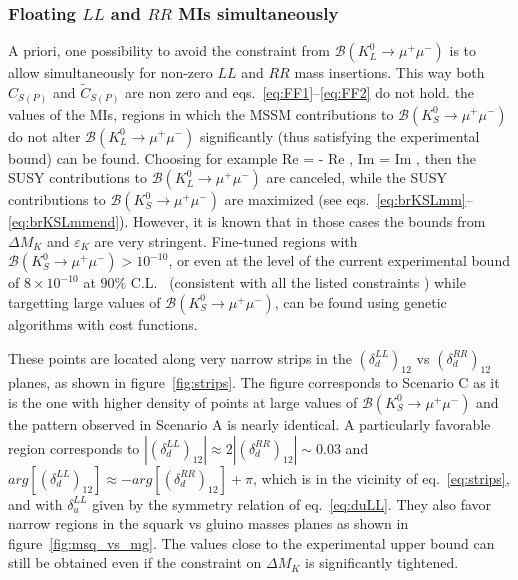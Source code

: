 \subsubsection{Floating $LL$ and $RR$ MIs simultaneously}
A priori, one possibility to avoid the constraint from $\mathcal{B}(K_L^0\rightarrow\mu^+\mu^-)$ is 
to allow simultaneously for non-zero $LL$ and $RR$ mass insertions. This way both $C_{S(P)}$ and $\tilde{C}_{S(P)}$ are non zero
and eqs.~\eqref{eq:FF1}--\eqref{eq:FF2} do not hold.  the values of the MIs, regions in which the MSSM contributions to 
$\mathcal{B}(K_S^0\rightarrow\mu^+\mu^-)$ do not alter $\mathcal{B}(K_L^0\rightarrow\mu^+\mu^-)$ significantly (thus satisfying the experimental bound) can be found. 
Choosing for example
\beq
\textrm{Re}  = - \textrm{Re} , \quad 
\textrm{Im}  = \textrm{Im} ,
\label{eq:strips}
\eeq
then the SUSY contributions to $\mathcal{B}(K_L^0\rightarrow\mu^+\mu^-)$ are canceled, while the SUSY contributions to $\mathcal{B}(K_S^0\rightarrow\mu^+\mu^-)$ are maximized (see eqs.~\eqref{eq:brKSLmm}--\eqref{eq:brKSLmmend}).
However, it is known that in those cases the bounds from $\Delta M_K$ and $\varepsilon_K$ are very stringent. Fine-tuned regions with  $\mathcal{B}(K_S^0\rightarrow\mu^+\mu^-) > 10^{-10}$, or even at the level of the current experimental bound of $8\times 10 ^{-10}$ at $90\%$ C.L.~\cite{LHCb:KsMuMu} (consistent with all the listed constraints ) while targetting large values of $\mathcal{B}(K_S^0\rightarrow\mu^+\mu^-)$, can be found using genetic algorithms with cost functions.
 
These points are located along very narrow strips in the $\left(\delta_{d}^{LL}\right)_{12}$ vs $\left(\delta_{d}^{RR}\right)_{12}$ planes, as shown in figure~\ref{fig:strips}. The figure corresponds to Scenario C as it is the one with higher density of points at large values of $\mathcal{B}(K_S^0\rightarrow\mu^+\mu^-)$ and the pattern observed in Scenario A is nearly identical.
A particularly favorable region corresponds to $|(\delta_d^{LL})_{12}| \approx 2|(\delta_d^{RR})_{12}| \sim 0.03$
and $arg\left[(\delta_d^{LL})_{12}\right] \approx -arg\left[(\delta_d^{RR})_{12}\right] + \pi$, which is in the vicinity of eq.~\eqref{eq:strips}, and with $\delta_u^{LL}$ given by the symmetry relation of eq.~\eqref{eq:duLL}. 
They also favor narrow regions in the squark vs gluino masses planes as shown in figure~\ref{fig:msq_vs_mg}. The values close to the experimental upper bound can still be obtained even if the constraint on $\Delta M_K$ is significantly tightened.

